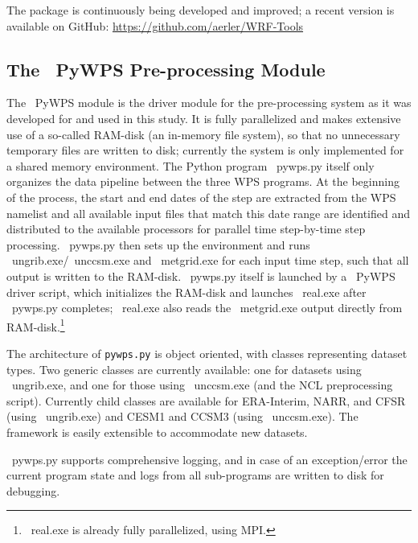 \documentclass[letterpaper,12pt,headsepline,final]{scrartcl} %
\newcommand{\wrftools}{\mbox{\color{violet} \sffamily WRF~Tools}}
\newcommand{\ungrib}{\mbox{\color{purple} \ttfamily ungrib.exe}}
\newcommand{\unccsm}{\mbox{\color{red} \ttfamily unccsm.exe}}
\newcommand{\metgrid}{\mbox{\color{cyan} \ttfamily metgrid.exe}}
\newcommand{\real}{\mbox{\color{violet} \ttfamily real.exe}}
\newcommand{\PyWPS}{\mbox{\color{teal} \sffamily PyWPS}}
\newcommand{\pywps}{\mbox{\color{teal} \ttfamily pywps.py}}
\begin{document}
The package is continuously being developed and improved; a recent version is available on GitHub: \url{https://github.com/aerler/WRF-Tools}

\subsection{The \PyWPS{} Pre-processing Module}
\label{tool:pywps}
The \PyWPS{} module is the driver module for the pre-processing system as it was developed for and used in this study. It is fully parallelized and makes extensive use of a so-called \textsf{RAM}-disk (an in-memory file system), so that no unnecessary temporary files are written to disk; currently the system is only implemented for a shared memory environment.
The Python program \pywps{} itself only organizes the data pipeline between the three WPS programs.
At the beginning of the process, the start and end dates of the step are extracted from the WPS namelist and all available input files that match this date range are identified and distributed to the available processors for parallel time step-by-time step processing.
\pywps{} then sets up the environment and runs \ungrib{}/\unccsm{} and \metgrid{} for each input time step, such that all output is written to the \textsf{RAM}-disk.
\pywps{} itself is launched by a \PyWPS{} driver script, which initializes the RAM-disk and launches \real{} after \pywps{} completes; \real{} also reads the \metgrid{} output directly from RAM-disk.\footnote{\real{} is already fully parallelized, using MPI.}

The architecture of \texttt{pywps.py} is object oriented, with classes representing dataset types. Two generic classes are currently available: one for datasets using \ungrib{}, and one for those using \unccsm{} (and the NCL preprocessing script). Currently child classes are available for ERA-Interim, NARR, and CFSR (using \ungrib{}) and CESM1 and CCSM3 (using \unccsm{}). The framework is easily extensible to accommodate new datasets.%

\pywps{} supports comprehensive logging, and in case of an exception/error the current program state and logs from all sub-programs are written to disk for debugging.
\end{document}
